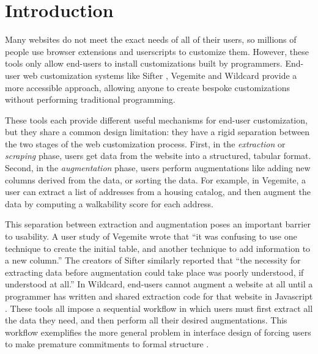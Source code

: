 \documentclass[sigconf,10pt]{acmart}
\begin{document}

\maketitle
\pagestyle{plain}

\hypertarget{sec:introduction}{%
\section{Introduction}\label{sec:introduction}}

Many websites do not meet the exact needs of all of their users, so
millions of people use browser extensions and userscripts
\citep{zotero-224, 2021f} to customize them. However, these tools only
allow end-users to install customizations built by programmers. End-user
web customization systems like Sifter \citep{huynh2006}, Vegemite
\citep{lin2009} and Wildcard \citep{litt2020} provide a more accessible
approach, allowing anyone to create bespoke customizations without
performing traditional programming.

These tools each provide different useful mechanisms for end-user
customization, but they share a common design limitation: they have a
rigid separation between the two stages of the web customization
process. First, in the \emph{extraction} or \emph{scraping} phase, users
get data from the website into a structured, tabular format. Second, in
the \emph{augmentation} phase, users perform augmentations like adding
new columns derived from the data, or sorting the data. For example, in
Vegemite, a user can extract a list of addresses from a housing catalog,
and then augment the data by computing a walkability score for each
address.

This separation between extraction and augmentation poses an important
barrier to usability. A user study \citep{lin2009} of Vegemite wrote
that ``it was confusing to use one technique to create the initial
table, and another technique to add information to a new column.'' The
creators of Sifter similarly reported \citep{huynh2006} that ``the
necessity for extracting data before augmentation could take place was
poorly understood, if understood at all.'' In Wildcard, end-users cannot
augment a website at all until a programmer has written and shared
extraction code for that website in Javascript \citep{litt2020}. These
tools all impose a sequential workflow in which users must first extract
all the data they need, and then perform all their desired
augmentations. This workflow exemplifies the more general problem in
interface design of forcing users to make premature commitments to
formal structure \citep{shipman1999, blackwell2001}.
\end{document}
